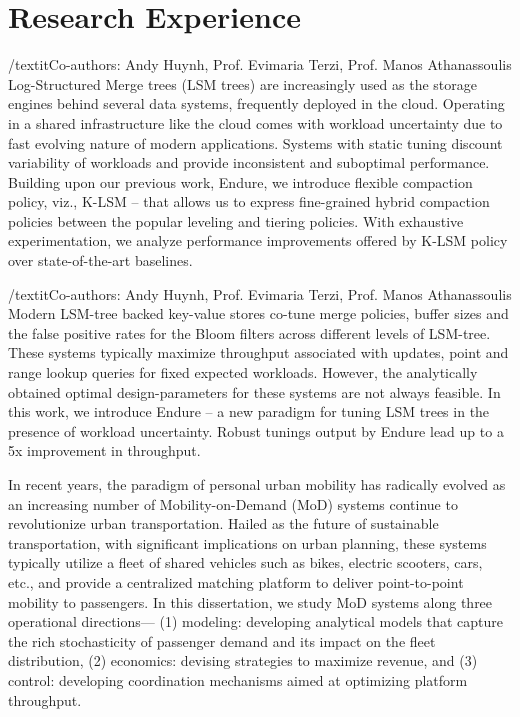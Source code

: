 \documentclass[10pt]{moderncv}
\begin{document}
\section{Research Experience}
{
    /textit{Co-authors: Andy Huynh, Prof. Evimaria Terzi, Prof. Manos Athanassoulis}\\
    Log-Structured Merge trees (LSM trees) are increasingly used as the storage engines behind several data systems,
        frequently deployed in the cloud. 
    Operating in a shared infrastructure like the cloud comes with workload uncertainty due to fast evolving nature of 
        modern applications. 
    Systems with static tuning discount variability of workloads and provide inconsistent and suboptimal performance. 
    Building upon our previous work, Endure, we introduce flexible compaction policy, viz., K-LSM -- that allows us to 
        express fine-grained hybrid compaction policies between the popular leveling and tiering policies. 
    With exhaustive experimentation, we analyze performance improvements offered by K-LSM policy over state-of-the-art 
        baselines.
}

{
    /textit{Co-authors: Andy Huynh, Prof. Evimaria Terzi, Prof. Manos Athanassoulis}\\
    Modern LSM-tree backed key-value stores co-tune merge policies, buffer sizes and the false positive rates for the 
        Bloom filters across different levels of LSM-tree. 
    These systems typically maximize throughput associated with updates, point and range lookup queries for fixed 
        expected workloads. 
    However, the analytically obtained optimal design-parameters for these systems are not always feasible. 
    In this work, we introduce Endure -- a new paradigm for tuning LSM trees in the presence of workload uncertainty. 
    Robust tunings output by Endure lead up to a 5x improvement in throughput.
}

{
    In recent years, the paradigm of personal urban mobility has radically evolved as an increasing number of 
        Mobility-on-Demand (MoD) systems continue to revolutionize urban transportation. 
    Hailed as the future of sustainable transportation, with significant implications on urban planning, these systems 
        typically utilize a fleet of shared vehicles such as bikes, electric scooters, cars, etc., and provide a 
        centralized matching platform to deliver point-to-point mobility to passengers. 
    In this dissertation, we study MoD systems along three operational directions—
    (1) modeling: developing analytical models that capture the rich stochasticity of passenger demand and its impact 
        on the fleet distribution,
    (2) economics: devising strategies to maximize revenue, and 
    (3) control: developing coordination mechanisms aimed at optimizing platform throughput.
}
\end{document}
